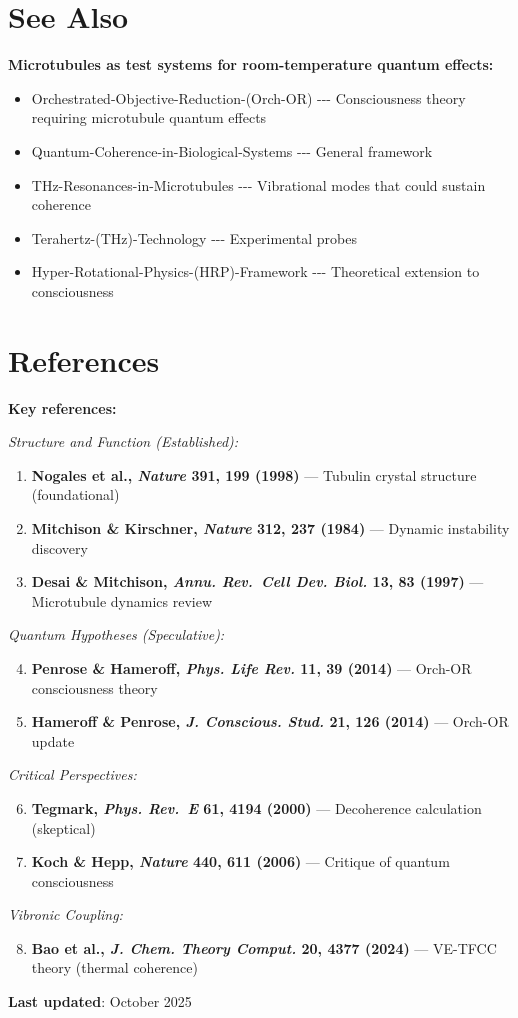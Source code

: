 \section{See Also}
\label{sec:see-also}

\textbf{Microtubules as test systems for room-temperature quantum effects:}
\begin{itemize}
\tightlist
\item
  Orchestrated-Objective-Reduction-(Orch-OR) -\/-\/-
  Consciousness theory requiring microtubule quantum effects
\item
  Quantum-Coherence-in-Biological-Systems -\/-\/- General
  framework
\item
  THz-Resonances-in-Microtubules -\/-\/- Vibrational modes
  that could sustain coherence
\item
  Terahertz-(THz)-Technology -\/-\/- Experimental probes
\item
  Hyper-Rotational-Physics-(HRP)-Framework -\/-\/-
  Theoretical extension to consciousness
\end{itemize}

\section{References}
\label{sec:references}

\textbf{Key references:}

\textit{Structure and Function (Established):}
\begin{enumerate}
\item \textbf{Nogales et al., \emph{Nature} 391, 199 (1998)} --- Tubulin crystal structure (foundational)
\item \textbf{Mitchison \& Kirschner, \emph{Nature} 312, 237 (1984)} --- Dynamic instability discovery
\item \textbf{Desai \& Mitchison, \emph{Annu. Rev.~Cell Dev. Biol.} 13, 83 (1997)} --- Microtubule dynamics review
\end{enumerate}

\textit{Quantum Hypotheses (Speculative):}
\begin{enumerate}
\setcounter{enumi}{3}
\item \textbf{Penrose \& Hameroff, \emph{Phys. Life Rev.} 11, 39 (2014)} --- Orch-OR consciousness theory
\item \textbf{Hameroff \& Penrose, \emph{J. Conscious. Stud.} 21, 126 (2014)} --- Orch-OR update
\end{enumerate}

\textit{Critical Perspectives:}
\begin{enumerate}
\setcounter{enumi}{5}
\item \textbf{Tegmark, \emph{Phys. Rev.~E} 61, 4194 (2000)} --- Decoherence calculation (skeptical)
\item \textbf{Koch \& Hepp, \emph{Nature} 440, 611 (2006)} --- Critique of quantum consciousness
\end{enumerate}

\textit{Vibronic Coupling:}
\begin{enumerate}
\setcounter{enumi}{7}
\item \textbf{Bao et al., \emph{J. Chem. Theory Comput.} 20, 4377 (2024)} --- VE-TFCC theory (thermal coherence)
\end{enumerate}

\textbf{Last updated}: October 2025
